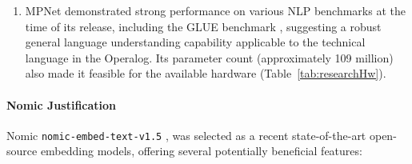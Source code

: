 \documentclass[10pt,oneside]{report}
\begin{document}
\begin{enumerate}
    \item MPNet demonstrated strong performance on various NLP benchmarks at the time of its release, including the GLUE benchmark \cite{wang2018glue, song2020mpnet}, suggesting a robust general language understanding capability applicable to the technical language in the Operalog. Its parameter count (approximately 109 million) also made it feasible for the available hardware (Table~\ref{tab:researchHw}).
\end{enumerate}

\paragraph{Nomic Justification}
Nomic \texttt{nomic-embed-text-v1.5} \cite{nussbaum2024nomic, nussbaum2024nomic1.5}, was selected as a recent state-of-the-art open-source embedding models, offering several potentially beneficial features:
\end{document}
